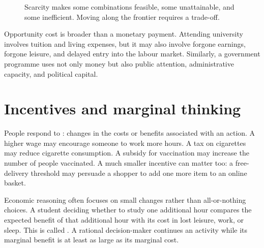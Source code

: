 \begin{figure}[htbp]
  \centering
  \caption{Scarcity makes some combinations feasible, some unattainable, and some inefficient. Moving along the frontier requires a trade-off.}
  \label{fig:scarcity-ppf}
\end{figure}

Opportunity cost is broader than a monetary payment. Attending university involves tuition and living expenses, but it may also involve forgone earnings, forgone leisure, and delayed entry into the labour market. Similarly, a government programme uses not only money but also public attention, administrative capacity, and political capital.

\section{Incentives and marginal thinking}

People respond to : changes in the costs or benefits
associated with an action. A higher wage may encourage someone to work more
hours. A tax on cigarettes may reduce cigarette consumption. A subsidy for
vaccination may increase the number of people vaccinated. A much smaller
incentive can matter too: a free-delivery threshold may persuade a shopper to
add one more item to an online basket.

Economic reasoning often focuses on small changes rather than all-or-nothing choices. A student deciding whether to study one additional hour compares the expected benefit of that additional hour with its cost in lost leisure, work, or sleep. This is called . A rational decision-maker continues an activity while its marginal benefit is at least as large as its marginal cost.

